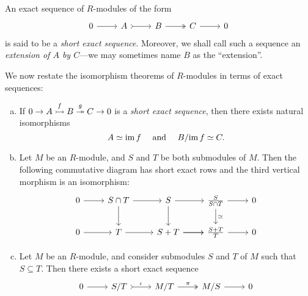 \begin{definition}
    \label{def:exact-sequence-module}
    An exact sequence of \(R\)-modules of the form
    \[
        \begin{tikzcd}
            0 \ar[r] &A \ar[r, tail] &B \ar[r, two heads] &C \ar[r] &0
        \end{tikzcd}
    \]
    is said to be a \emph{short exact sequence}. Moreover, we shall call such a
    sequence an \emph{extension of \(A\) by \(C\)}---we may sometimes name \(B\) as
    the ``extension''.
\end{definition}

\begin{proposition}
    \label{prop:isomorphism-thms-with-exact-sequences}
    We now restate the isomorphism theorems of \(R\)-modules in terms of exact
    sequences:
    \begin{enumerate}[(a)]\setlength\itemsep{0em}
        \item If \(0 \to A \overset{f}{\rightarrowtail} B \overset{g}{\twoheadrightarrow} C \to 0\) is a
              \emph{short exact sequence}, then there exists natural isomorphisms
              \[
                  A \simeq \operatorname{im} f \quad\text{ and }\quad B/{\operatorname{im} f} \simeq C.
              \]
        \item Let \(M\) be an \(R\)-module, and \(S\) and \(T\) be both submodules of
              \(M\). Then the following commutative diagram has short exact rows and the
              third vertical morphism is an isomorphism:
              \[
                  \begin{tikzcd}
                      0 \ar[r] &S \cap T \ar[d] \ar[r] &S \ar[r] \ar[d]
                      &\frac{S}{S \cap T} \ar[r] \ar[d, "\dis"] &0
                      \\
                      0 \ar[r] &T \ar[r] &S + T \ar[r] \ar[r] &\frac{S + T}{T} \ar[r] &0
                  \end{tikzcd}
              \]
        \item Let \(M\) be an \(R\)-module, and consider submodules \(S\) and \(T\) of
              \(M\) such that \(S \subseteq T\). Then there exists a short exact sequence
              \[
                  \begin{tikzcd}
                      0 \ar[r] &S/T \ar[r, tail, "\iota"] &M/T \ar[r, two heads, "\pi"]
                      &M/S \ar[r] &0
                  \end{tikzcd}
              \]
    \end{enumerate}
\end{proposition}

